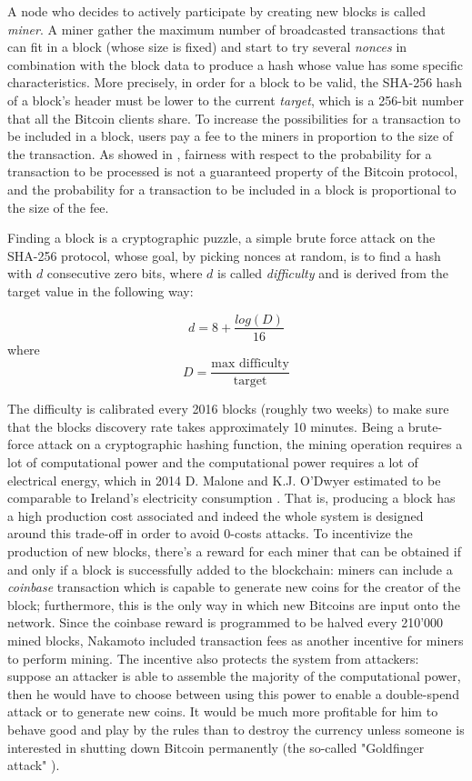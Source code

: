 		A node who decides to actively participate by creating new blocks is called \textit{miner}. A miner gather the maximum number of broadcasted transactions that can fit in a block (whose size is fixed) and start to try several \textit{nonces} in combination with the block data to produce a hash whose value has some specific characteristics. More precisely, in order for a block to be valid, the SHA-256 hash of a block's header must be lower to the current \textit{target}, which is a 256-bit number that all the Bitcoin clients share. To increase the possibilities for a transaction to be included in a block, users pay a fee to the miners in proportion to the size of the transaction. As showed in \cite{Gurcan2017}, fairness with respect to the probability for a transaction to be processed is not a guaranteed property of the Bitcoin protocol, and the probability for a transaction to be included in a block is proportional to the size of the fee.
		
		Finding a block is a cryptographic puzzle, a simple brute force attack on the SHA-256 protocol, whose goal, by picking nonces at random, is to find a hash with \(d\) consecutive zero bits, where \(d\) is called \textit{difficulty} and is derived from the target value in the following way:
		
		\[ d = 8 + \frac{log(D)}{16}\] 
		where
		\[D = \frac{\text{max difficulty}}{\text{target}}\]
		
		The difficulty is calibrated every 2016 blocks (roughly two weeks) to make sure that the blocks discovery rate takes approximately 10 minutes. Being a brute-force attack on a cryptographic hashing function, the mining operation requires a lot of computational power and the computational power requires a lot of electrical energy, which in 2014 D. Malone and  K.J. O'Dwyer estimated to be comparable to Ireland's electricity consumption \cite{Malone2014}. That is, producing a block has a high production cost associated and indeed the whole system is designed around this trade-off in order to avoid 0-costs attacks. To incentivize the production of new blocks, there's a reward for each miner that can be obtained if and only if a block is successfully added to the blockchain: miners can include a \textit{coinbase} transaction which is capable to generate new coins for the creator of the block; furthermore, this is the only way in which new Bitcoins are input onto the network. Since the coinbase reward is programmed to be halved every 210'000 mined blocks, Nakamoto included transaction fees as another incentive for miners to perform mining. The incentive also protects the system from attackers: suppose an attacker is able to assemble the majority of the computational power, then he would have to choose between using this power to enable a double-spend attack or to generate new coins. It would be much more profitable for him to behave good and play by the rules than to destroy the currency unless someone is interested in shutting down Bitcoin permanently (the so-called "Goldfinger attack" \cite{Bonneau2015}).
		

